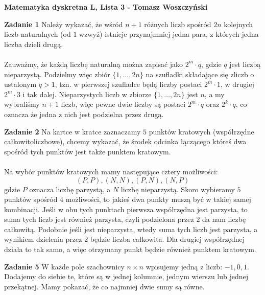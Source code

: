 \documentclass[a4paper,12pt]{article}
\newcommand{\pair}[1]{\left( #1 \right)}
\begin{document}
\noindent \textbf{Matematyka dyskretna L, Lista 3 - Tomasz Woszczyński}\newline

\noindent \newline \textbf{Zadanie 1} \newline
Należy wykazać, że wśród $n+1$ różnych liczb spośród $2n$ kolejnych liczb naturalnych (od $1$ wzwyż) istnieje przynajmniej jedna para, z których jedna liczba dzieli drugą. \\ \\
Zauważmy, że każdą liczbę naturalną można zapisać jako $2^m \cdot q$, gdzie $q$ jest liczbą nieparzystą. Podzielmy więc zbiór $\{ 1, \dots, 2n \}$ na szufladki składające się zliczb o ustalonym $q > 1$, tzn. w pierwszej szufladce będą liczby postaci $2^m \cdot 1$, w drugiej $2^m \cdot 3$ i tak dalej. Nieparzystych liczb w zbiorze $\{ 1, \dots, 2n \}$ jest $n$, a my wybraliśmy $n + 1$ liczb, więc pewne dwie liczby są postaci $2^m \cdot q$ oraz $2^k \cdot q$, co oznacza że jedna z nich jest podzielna przez drugą.

\noindent \newline \textbf{Zadanie 2} \newline
Na kartce w kratce zaznaczamy $5$ punktów kratowych (współrzędne całkowitoliczbowe), chcemy wykazać, że środek odcinka łączącego któreś dwa spośród tych punktów jest także punktem kratowym. \\ \\

\noindent Na wybór punktów kratowych mamy następujące cztery możliwości:
$$\pair{P, P}, \pair{N, N}, \pair{P, N}, \pair{N, P}$$
\noindent gdzie $P$ oznacza liczbę parzystą, a $N$ liczbę nieparzystą. Skoro wybieramy $5$ punktów spośród $4$ możliwości, to jakieś dwa punkty muszą być w takiej samej kombinacji. Jeśli w obu tych punktach pierwsza współrzędna jest parzysta, to suma tych liczb jest również parzysta, czyli podzielona przez $2$ da nam liczbę całkowitą. Podobnie jeśli jest nieparzysta, wtedy suma tych liczb jest parzysta, a wynikiem dzielenia przez $2$ będzie liczba całkowita. Dla drugiej współrzędnej działa to tak samo, a więc otrzymany punkt będzie również punktem kratowym.

\noindent \newline \textbf{Zadanie 5} \newline
W każde pole szachownicy $n \times n$ wpisujemy jedną z liczb: $-1, 0, 1$. Dodajemy do siebie te, które są w jednej kolumnie, jednym wierszu lub jednej przekątnej. Mamy pokazać, że co najmniej dwie sumy są równe. \\ \\
\end{document}
